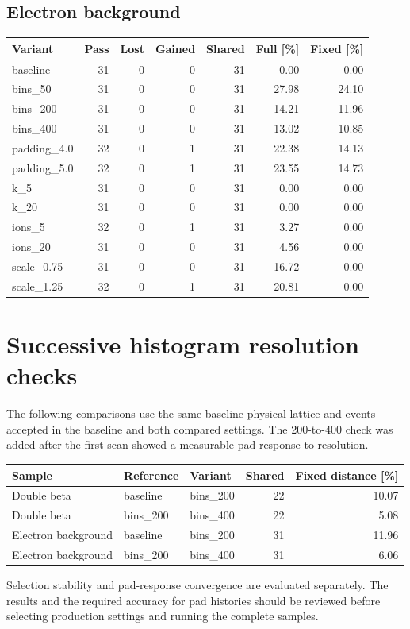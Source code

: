 \documentclass[11pt]{article}
\begin{document}
\subsection*{Electron background}
\begin{center}\small\begin{tabular}{lrrrrrr}\toprule
Variant & Pass & Lost & Gained & Shared & Full [\%] & Fixed [\%] \\\midrule
baseline & 31 & 0 & 0 & 31 & 0.00 & 0.00 \\
bins\_50 & 31 & 0 & 0 & 31 & 27.98 & 24.10 \\
bins\_200 & 31 & 0 & 0 & 31 & 14.21 & 11.96 \\
bins\_400 & 31 & 0 & 0 & 31 & 13.02 & 10.85 \\
padding\_4.0 & 32 & 0 & 1 & 31 & 22.38 & 14.13 \\
padding\_5.0 & 32 & 0 & 1 & 31 & 23.55 & 14.73 \\
k\_5 & 31 & 0 & 0 & 31 & 0.00 & 0.00 \\
k\_20 & 31 & 0 & 0 & 31 & 0.00 & 0.00 \\
ions\_5 & 32 & 0 & 1 & 31 & 3.27 & 0.00 \\
ions\_20 & 31 & 0 & 0 & 31 & 4.56 & 0.00 \\
scale\_0.75 & 31 & 0 & 0 & 31 & 16.72 & 0.00 \\
scale\_1.25 & 32 & 0 & 1 & 31 & 20.81 & 0.00 \\
\bottomrule\end{tabular}\end{center}

\section*{Successive histogram resolution checks}
The following comparisons use the same baseline physical lattice and events
accepted in the baseline and both compared settings. The 200-to-400 check was
added after the first scan showed a measurable pad response to resolution.
\begin{center}\small\begin{tabular}{lllrr}\toprule
Sample & Reference & Variant & Shared & Fixed distance [\%] \\\midrule
Double beta & baseline & bins\_200 & 22 & 10.07 \\
Double beta & bins\_200 & bins\_400 & 22 & 5.08 \\
Electron background & baseline & bins\_200 & 31 & 11.96 \\
Electron background & bins\_200 & bins\_400 & 31 & 6.06 \\
\bottomrule\end{tabular}\end{center}
Selection stability and pad-response convergence are evaluated separately.
The results and the required accuracy for pad histories should be reviewed
before selecting production settings and running the complete samples.
\end{document}
